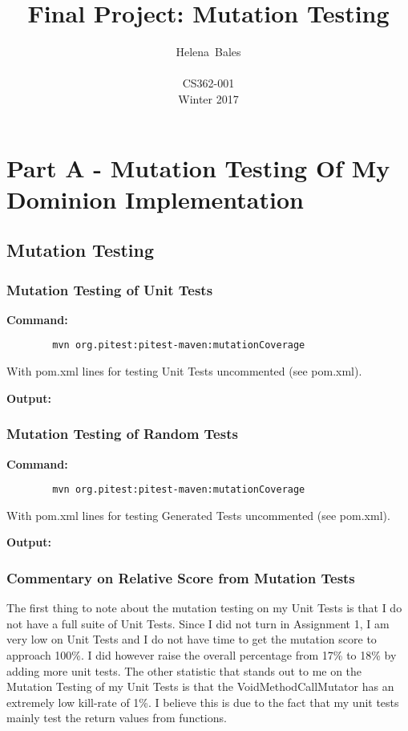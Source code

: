 \documentclass[letterpaper,10pt]{article}
\title{Final Project: Mutation Testing}
\author{Helena~Bales\\ \\ CS362-001 \\ Winter 2017}
\begin{document}
\maketitle

\clearpage
\tableofcontents
\clearpage

\section{Part A - Mutation Testing Of My Dominion Implementation}
	\subsection{Mutation Testing}
		\subsubsection{Mutation Testing of Unit Tests}
		\textbf{Command:} \\ 
		\begin{lstlisting}
		mvn org.pitest:pitest-maven:mutationCoverage 
		\end{lstlisting}

		With pom.xml lines for testing Unit Tests uncommented (see pom.xml).

		\textbf{Output:}\\
		

		\subsubsection{Mutation Testing of Random Tests}
		\textbf{Command: }
		\begin{lstlisting}
		mvn org.pitest:pitest-maven:mutationCoverage 
		\end{lstlisting}

		With pom.xml lines for testing Generated Tests uncommented (see pom.xml).

		\textbf{Output: }
		

		\subsubsection{Commentary on Relative Score from Mutation Tests}
		The first thing to note about the mutation testing on my Unit Tests is that I do not 
		have a full suite of Unit Tests. Since I did not turn in Assignment 1, I am very low 
		on Unit Tests and I do not have time to get the mutation score to approach 100\%. I 
		did however raise the overall percentage from 17\% to 18\% by adding more unit tests. 
		The other statistic that stands out to me on the Mutation Testing of my Unit Tests is 
		that the VoidMethodCallMutator has an extremely low kill-rate of 1\%. I believe this 
		is due to the fact that my unit tests mainly test the return values from functions.
\end{document}

